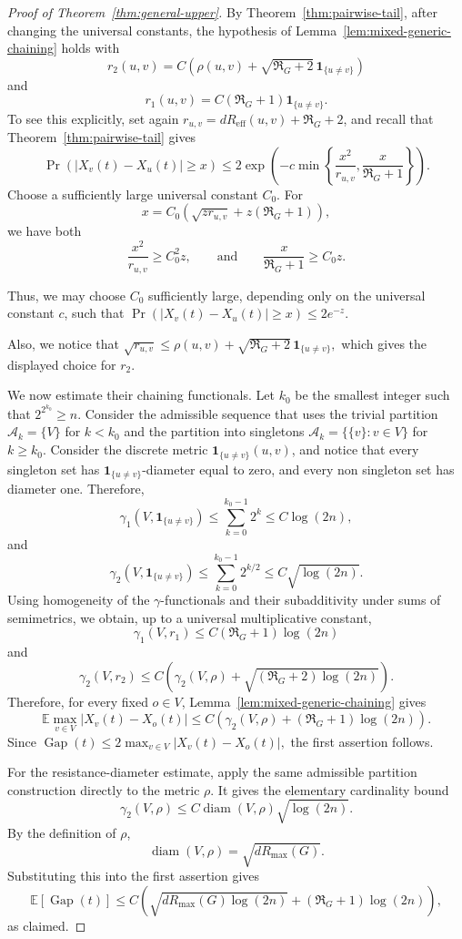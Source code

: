 \documentclass[11pt]{article}
\numberwithin{equation}{section}
\newcommand{\E}{\mathbb{E}}
\newcommand{\1}{\mathbf{1}}
\newcommand{\Gap}{\operatorname{Gap}}
\begin{document}
\begin{proof}[Proof of Theorem~\ref{thm:general-upper}]
By Theorem~\ref{thm:pairwise-tail}, after changing the universal constants, the hypothesis of Lemma~\ref{lem:mixed-generic-chaining} holds with
\[
r_2(u,v)
=
C\left(
\rho(u,v)
+
\sqrt{\Re_G+2}\,\mathbf 1_{\{u\ne v\}}
\right)
\]
and
\[
r_1(u,v)
=
C(\Re_G+1)\mathbf 1_{\{u\ne v\}}.
\]
To see this explicitly, set again
\( r_{u,v} = dR_{\mathrm{eff}}(u,v)+\Re_G+2\), and recall that Theorem~\ref{thm:pairwise-tail} gives
\[
\Pr\left(
|X_v(t)-X_u(t)|\ge x
\right)
\le
2\exp\left(
-c\min\left\{
\frac{x^2}{r_{u,v}},
\frac{x}{\Re_G+1}
\right\}
\right).
\]
Choose a sufficiently large universal constant \(C_0\). For
\[
x
=
C_0\left(
\sqrt{zr_{u,v}}
+
z(\Re_G+1)
\right),
\]
we have both
\[
\frac{x^2}{r_{u,v}}
\ge
C_0^2z, \qquad \text{and} \qquad
\frac{x}{\Re_G+1}
\ge
C_0z.
\]

Thus, we may choose \(C_0\) sufficiently large, depending only on the universal constant \(c\), such that \(\Pr\left(|X_v(t)-X_u(t)|\ge x \right) \le 2e^{-z}.\) 

Also, we notice that \(\sqrt{r_{u,v}}\le \rho(u,v)+\sqrt{\Re_G+2}\,\mathbf 1_{\{u\ne v\}},\) which gives the displayed choice for \(r_2\).

\medskip

We now estimate their chaining functionals. Let \(k_0\) be the smallest integer such that
\(2^{2^{k_0}}\ge n.\) Consider the admissible sequence that uses the trivial partition \(\mathcal A_k = \{V\}\) for \(k<k_0\) and the partition into singletons \(\mathcal A _k = \{\{v\}:v\in V\}\) for \(k\ge k_0\). Consider the discrete metric $\mathbf 1_{\{u\neq v\}}(u,v)$, and notice that every singleton set has \(\mathbf 1_{\{u\neq v\}}\)-diameter equal to zero, and every non singleton set has diameter one. Therefore,
\[
\gamma_1(V,\mathbf 1_{\{u\neq v\}})
\le
\sum_{k=0}^{k_0-1}2^k
\le
C\log(2n),
\]
and
\[
\gamma_2(V,\mathbf 1_{\{u\neq v\}})
\le
\sum_{k=0}^{k_0-1}2^{k/2}
\le
C\sqrt{\log(2n)}.
\]
Using homogeneity of the \(\gamma\)-functionals and their subadditivity under sums of semimetrics, we obtain, up to a universal multiplicative constant,
\[
\gamma_1(V,r_1)
\le
C(\Re_G+1)\log(2n)
\]
and
\[
\gamma_2(V,r_2)
\le
C\left(
\gamma_2(V,\rho)
+
\sqrt{(\Re_G+2)\log(2n)}
\right).
\]
Therefore, for every fixed \(o\in V\), Lemma~\ref{lem:mixed-generic-chaining} gives
\[
\E\max_{v\in V}|X_v(t)-X_o(t)|
\le
C\left(
\gamma_2(V,\rho)
+
(\Re_G+1)\log(2n)
\right).
\]
Since \(
\Gap(t)
\le
2\max_{v\in V}|X_v(t)-X_o(t)|,
\) the first assertion follows.

\medskip

For the resistance-diameter estimate, apply the same admissible partition construction directly to the metric \(\rho\). It gives the elementary cardinality bound
\[
\gamma_2(V,\rho)
\le
C\operatorname{diam}(V,\rho)\sqrt{\log(2n)}.
\]
By the definition of \(\rho\),
\[
\operatorname{diam}(V,\rho)
=
\sqrt{dR_{\max}(G)}.
\]
Substituting this into the first assertion gives
\[
\E[\Gap(t)]
\le
C\left(
\sqrt{dR_{\max}(G)\log(2n)}
+
(\Re_G+1)\log(2n)
\right),
\]
as claimed.
\end{proof}
\end{document}
